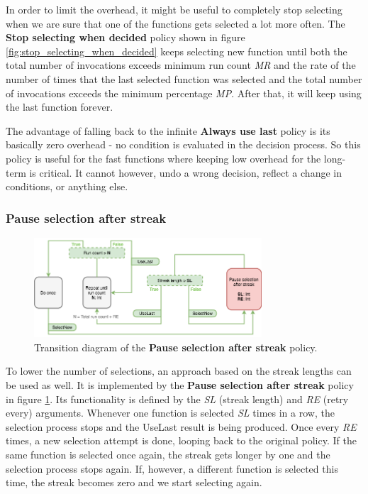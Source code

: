 In order to limit the overhead, it might be useful to completely stop selecting when we are sure that one of the functions gets selected a lot more often. The \textbf{Stop selecting when decided} policy shown in figure \ref{fig:stop_selecting_when_decided} keeps selecting new function until both the total number of invocations exceeds minimum run count \textit{MR} and the rate of the number of times that the last selected function was selected and the total number of invocations exceeds the minimum percentage \textit{MP}. After that, it will keep using the last function forever. 

The advantage of falling back to the infinite \textbf{Always use last} policy is its basically zero overhead - no condition is evaluated in the decision process. So this policy is useful for the fast functions where keeping low overhead for the long-term is critical. It cannot however, undo a wrong decision, reflect a change in conditions, or anything else.

\subsubsection{Pause selection after streak}

\begin{figure}[h!]
	\captionsetup{justification=centering,margin=0.5cm}
	\centerline{\mbox{\includegraphics[width=85mm]{./img/pause_selection_after_streak.png}}}
	\caption{Transition diagram of the \textbf{Pause selection after streak} policy.}
	\label{fig:pause_selection_after_streak}
\end{figure}

To lower the number of selections, an approach based on the streak lengths can be used as well. It is implemented by the \textbf{Pause selection after streak} policy in figure \ref{fig:pause_selection_after_streak}. Its functionality is defined by the \textit{SL} (streak length) and \textit{RE} (retry every) arguments. Whenever one function is selected \textit{SL} times in a row, the selection process stops and the UseLast result is being produced. Once every \textit{RE} times, a new selection attempt is done, looping back to the original policy. If the same function is selected once again, the streak gets longer by one and the selection process stops again. If, however, a different function is selected this time, the streak becomes zero and we start selecting again.

